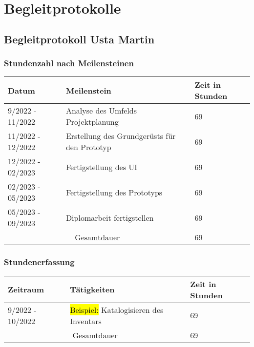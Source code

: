 \thispagestyle{empty}
\section{Begleitprotokolle}

\pagebreak

\subsection{Begleitprotokoll Usta Martin}

\subsubsection{Stundenzahl nach Meilensteinen}

\begin{tabular}{|m{}|m{}|m{}|}
    \hline
    \cellcolor{gray!10} Datum & \cellcolor{gray!10} Meilenstein & \cellcolor{gray!10} Zeit in Stunden \\
    \hline
    9/2022 - 11/2022 & Analyse des Umfelds Projektplanung & 69 \\
    \hline
    11/2022 - 12/2022 & Erstellung des Grundgerüsts für den Prototyp & 69 \\
    \hline
    12/2022 - 02/2023 & Fertigstellung des UI & 69 \\
    \hline
    02/2023 - 05/2023 & Fertigstellung des Prototyps & 69 \\
    \hline
    05/2023 - 09/2023 & Diplomarbeit fertigstellen & 69 \\ 
    \hline
    \multicolumn{2}{|c|}{\cellcolor{gray!30}Gesamtdauer} & 69 \\
    \hline
\end{tabular}

\noindent

\vspace{40pt}

\subsubsection{Stundenerfassung}

\begin{tabular}{|m{}|m{}|m{}|}
    \hline
    \cellcolor{gray!10} Zeitraum & \cellcolor{gray!10} Tätigkeiten & \cellcolor{gray!10} Zeit in Stunden \\
    \hline
    9/2022 - 10/2022 & \hl{Beispiel: } Katalogisieren des Inventars & 69 \\
    \hline
    \multicolumn{2}{|c|}{\cellcolor{gray!30}Gesamtdauer} & 69 \\
    \hline
\end{tabular}

